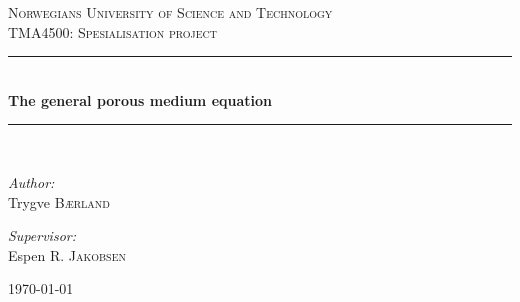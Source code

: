 \documentclass[11pt, a4paper]{article}
\newcommand{\HRule}{\rule{\linewidth}{0.5mm}}
\begin{document}
\pagestyle{empty}
\begin{titlepage}
\begin{center}


\textsc{\LARGE Norwegians University of Science and Technology}\\[1.5cm]

\textsc{\Large TMA4500: Spesialisation project}\\[0.5cm]

\HRule \\[0.4cm]
{ \huge \bfseries The general porous medium equation \\[0.4cm] }

\HRule \\[1.5cm]

\noindent
\begin{minipage}{0.4\textwidth}
\begin{flushleft} \large
\emph{Author:}\\
Trygve \textsc{Bærland}
\end{flushleft}
\end{minipage}%
\begin{minipage}{0.4\textwidth}
\begin{flushright} \large
\emph{Supervisor:} \\
Espen R. \textsc{Jakobsen}
\end{flushright}
\end{minipage}

\vfill

{\large \today}

\end{center}
\end{titlepage}


\newpage
\tableofcontents
{}
\theoremstyle{plain}
\newtheorem{theorem}{Theorem}[section]
\newtheorem{proposition}{Proposition}[section]
\newtheorem{cor}{Corollary}[section]
\newtheorem{lemma}{Lemma}[section]

\newtheorem{assumption}{Assumption}[section]
\end{document}
